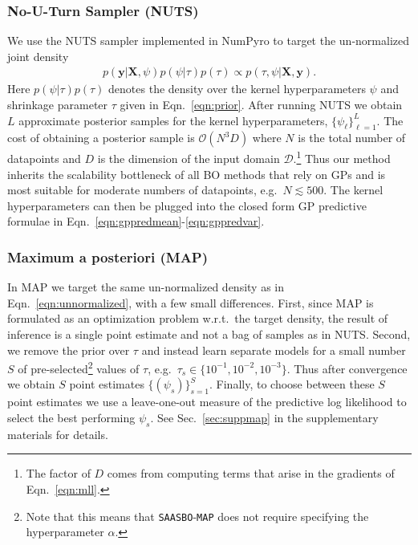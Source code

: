 \documentclass[accepted]{uai2021} %
\newcommand{\algoname}{{\texttt {SAASBO}}}
\newcommand{\by}{\mathbf{y}}
\newcommand{\bX}{\mathbf{X}}
\newcommand{\DD}{\mathcal{D}}
\newcommand{\OO}{\mathcal{O}}
\begin{document}
\subsubsection{No-U-Turn Sampler (NUTS)}
\label{sec:nuts}

We use the NUTS sampler implemented in NumPyro \citep{phan2019composable} to
target the un-normalized joint density
\begin{align}
\label{eqn:unnormalized}
 p(\by|\bX, \psi) p(\psi | \tau) p(\tau) \propto p(\tau, \psi | \bX, \by).
\end{align}
Here $p(\psi | \tau) p(\tau)$ denotes the density over the kernel hyperparameters
$\psi$ and shrinkage parameter $\tau$ given in Eqn.~\eqref{eqn:prior}.
After running NUTS we obtain $L$ approximate posterior samples for the kernel hyperparameters, $\{\psi_\ell \}_{\ell=1}^L$.
The cost of obtaining a posterior sample is $\OO(N^3D)$ where $N$ is the total number of datapoints
and $D$ is the dimension of the input domain $\DD$.\footnote{The factor of $D$ comes from computing
terms that arise in the gradients of Eqn.~\eqref{eqn:mll}.}
Thus our method inherits the scalability bottleneck of all BO methods that rely on GPs and is
most suitable for moderate numbers of datapoints, e.g.~$N \lesssim 500$.
The kernel hyperparameters can then be plugged into the closed form GP predictive formulae
in Eqn.~\eqref{eqn:gppredmean}-\eqref{eqn:gppredvar}.



\subsubsection{Maximum a posteriori (MAP)}
\label{sec:map}

In MAP we target the same un-normalized density as in Eqn.~\eqref{eqn:unnormalized}, with a few small differences.
First, since MAP is formulated as an optimization problem w.r.t.~the target density, the result
of inference is a single point estimate and not a bag of samples as in NUTS.
Second, we remove the prior over $\tau$ and instead learn separate models for
a small number $S$ of pre-selected\footnote{Note that this means that
\algoname-\texttt{MAP} does not require specifying the hyperparameter $\alpha$.} values of $\tau$, e.g.~$\tau_s \in \{10^{-1},10^{-2},10^{-3}\}$.
Thus after convergence %
we obtain $S$ point estimates $\{(\psi_s)\}_{s=1}^S$.
Finally, to choose between these $S$ point estimates we use a leave-one-out measure of the predictive log likelihood to select the best performing $\psi_s$.
See Sec.~\ref{sec:suppmap} in the supplementary materials for details.
\end{document}
